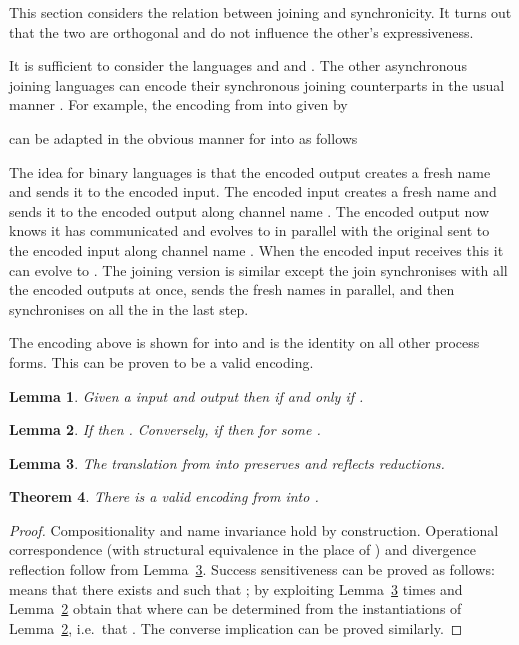 \documentclass[submission,copyright,creativecommons]{eptcs}
\newtheorem{theorem}{Theorem}[section]
\newtheorem{lemma}[theorem]{Lemma}
\begin{document}
This section considers the relation between joining and synchronicity. It turns out that
the two are orthogonal and do not influence the other's expressiveness.

It is sufficient to consider the languages  and
 and .
The other asynchronous joining languages can encode their synchronous joining
counterparts in the usual manner \cite{honda1991object}. 
For example, the encoding from  into 
given by

can be adapted in the obvious manner for
 into  as follows

The idea for binary languages is that the encoded output creates a fresh name  and sends it to the encoded input.
The encoded input creates a fresh name  and sends it to the encoded output along channel name .
The encoded output now knows it has communicated and evolves to  in parallel with the
original  sent to the encoded input along channel name .
When the encoded input receives this it can evolve to .
The joining version is similar except the join synchronises with all the encoded outputs at once,
sends the fresh names  in parallel, and then synchronises on all the  in the last step.

The encoding above is shown for  into 
and is the identity on all other process forms. This can be proven to be a valid encoding.

\begin{lemma}
\label{lem:minussynch-match}
Given a  input 
and output 
then  if and only if .
\end{lemma}

\begin{lemma}
\label{lem:minussynch-equiv}
If  then .
Conversely, if  then  for some .
\end{lemma}

\begin{lemma}
\label{lem:minussynch-red}
The translation  from  into  preserves
and reflects reductions.
\end{lemma}

\begin{theorem}
\label{thm:synch}
There is a valid encoding from  into .
\end{theorem}
\begin{proof}
Compositionality and name invariance hold by construction.
Operational correspondence (with structural equivalence in the place of )
and divergence reflection follow from Lemma~\ref{lem:minussynch-red}.
Success sensitiveness can be proved as follows:  means that there exists  and
 such that ; by exploiting Lemma~\ref{lem:minussynch-red}
 times and Lemma~\ref{lem:minussynch-equiv} obtain that
 where  can be determined from the
instantiations of Lemma~\ref{lem:minussynch-equiv},
i.e.~that .
The converse implication can be proved similarly.
\end{proof}
\end{document}
